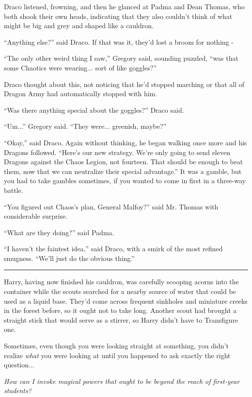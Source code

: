 Draco listened, frowning, and then he glanced at Padma and Dean Thomas, who both shook their own heads, indicating that they also couldn't think of what might be big and grey and shaped like a cauldron.

``Anything else?'' said Draco. If that was it, they'd lost a broom for nothing -

``The only other weird thing I saw,'' Gregory said, sounding puzzled, ``was that some Chaotics were wearing... sort of like goggles?''

Draco thought about this, not noticing that he'd stopped marching or that all of Dragon Army had automatically stopped with him.

``Was there anything special about the goggles?'' Draco said.

``Um...'' Gregory said. ``They were... greenish, maybe?''

``Okay,'' said Draco. Again without thinking, he began walking once more and his Dragons followed. ``Here's our new strategy. We're only going to send eleven Dragons against the Chaos Legion, not fourteen. That should be enough to beat them, now that we can neutralize their special advantage.'' It was a gamble, but you had to take gambles sometimes, if you wanted to come in first in a three-way battle.

``You figured out Chaos's plan, General Malfoy?'' said Mr. Thomas with considerable surprise.

``What are they doing?'' said Padma.

``I haven't the faintest idea,'' said Draco, with a smirk of the most refined smugness. ``We'll just do the obvious thing.''

\begin{center}\rule{3in}{0.4pt}\end{center}

Harry, having now finished his cauldron, was carefully scooping acorns into the container while the scouts searched for a nearby source of water that could be used as a liquid base. They'd come across frequent sinkholes and miniature creeks in the forest before, so it ought not to take long. Another scout had brought a straight stick that would serve as a stirrer, so Harry didn't have to Transfigure one.

Sometimes, even though you were looking straight at something, you didn't realize \emph{what} you were looking at until you happened to ask exactly the right question...

\emph{How can I invoke magical powers that ought to be beyond the reach of first-year students?}


